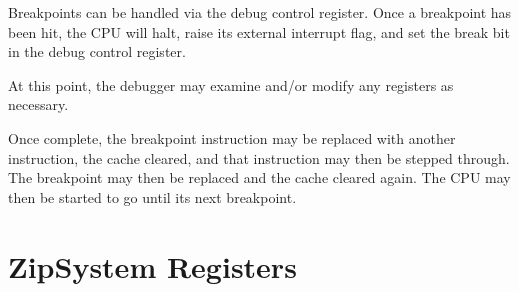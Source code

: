 \documentclass{gqtekspec}
\begin{document}
Breakpoints can be handled via the debug control register.  Once a breakpoint
has been hit, the CPU will halt, raise its external interrupt flag, and
set the break bit in the debug control register.

At this point, the debugger may examine and/or modify any registers as
necessary.

Once complete, the breakpoint instruction may be replaced with another
instruction, the cache cleared, and that instruction may then be stepped
through.  The breakpoint may then be replaced and the cache cleared again.
The CPU may then be started to go until its next breakpoint.
\section{ZipSystem Registers}
\end{document}
